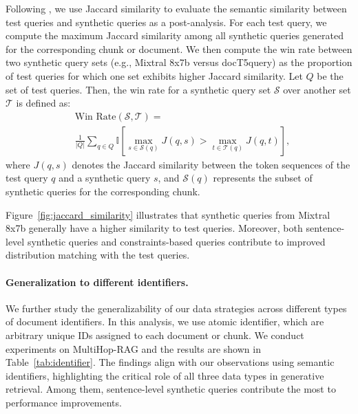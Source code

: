Following \citet{pradeep-etal-2023-generative}, we use Jaccard similarity to evaluate the semantic similarity between test queries and synthetic queries as a post-analysis. 
For each test query, we compute the maximum Jaccard similarity among all synthetic queries generated for the corresponding chunk or document. We then compute the win rate between two synthetic query sets (e.g., Mixtral 8x7b versus docT5query) as the proportion of test queries for which one set exhibits higher Jaccard similarity.
Let \(Q\) be the set of test queries. Then, the win rate for a synthetic query set \(\mathcal{S}\) over another set \(\mathcal{T}\) is defined as:
\begin{align*}
& \text{Win Rate}(\mathcal{S}, \mathcal{T}) = \\
& \frac{1}{|Q|} \sum_{q \in Q} \mathbb{I}\left[\max_{s \in \mathcal{S}(q)} J(q, s) > \max_{t \in \mathcal{T}(q)} J(q, t)\right],
\end{align*}
where $J(q, s)$ denotes the Jaccard similarity between the token sequences of the test query $q$ and a synthetic query $s$, and $\mathcal{S}(q)$ represents the subset of synthetic queries for the corresponding chunk.

Figure~\ref{fig:jaccard_similarity} illustrates that synthetic queries from Mixtral 8x7b generally have a higher similarity to test queries. Moreover, both sentence-level synthetic queries and constraints-based queries contribute to improved distribution matching with the test queries.

\begin{table}[t]
    \centering
    \small
    \caption{Ablation study on atomic identifier-based generative retrieval performance on MultiHop-RAG.}
    \label{tab:identifier}
\end{table}
\paragraph{Generalization to different identifiers.} We further study the generalizability of our data strategies across different types of document identifiers. In this analysis, we use atomic identifier, which are arbitrary unique IDs assigned to each document or chunk. We conduct experiments on MultiHop-RAG and the results are shown in Table~\ref{tab:identifier}. The findings align with our observations using semantic identifiers, highlighting the critical role of all three data types in generative retrieval. Among them, sentence-level synthetic queries contribute the most to performance improvements.


